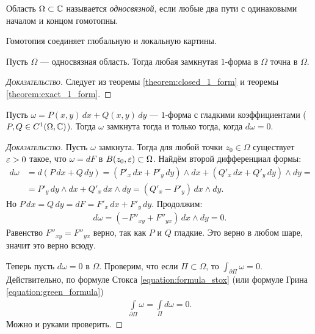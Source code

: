 \documentclass[../../main.tex]{subfiles}
\begin{document}
\begin{df}
 Область $\Omega \subset \mathbb{C}$ называется \textit{односвязной}, если любые два пути с одинаковыми началом и концом гомотопны.
\end{df}

Гомотопия соединяет глобальную и локальную картины.

\begin{crly}
 Пусть $\Omega$ --- односвязная область. Тогда любая замкнутая $1$-форма в $\Omega$ точна в $\Omega$.
\end{crly}
\begin{proof}[\normalfont\textsc{Доказательство}]
 Следует из теоремы \ref{theorem:closed_1_form} и теоремы \ref{theorem:exact_1_form}.
\end{proof}

\begin{thm}
 Пусть $\omega = P(x,y)\,dx + Q(x,y)\,dy$ --- $1$-форма с гладкими коэффициентами ($P, Q \in C^{1}(\Omega, \mathbb{C})$). Тогда $\omega$ замкнута тогда и только тогда, когда $d \omega = 0$.
\end{thm}
\begin{proof}[\normalfont\textsc{Доказательство}]
 Пусть $\omega$ замкнута. Тогда для любой точки $z_0 \in \Omega$  существует $\varepsilon > 0$ такое, что $\omega = dF$ в $B(z_0, \varepsilon) \subset \Omega$. Найдём второй дифференциал формы:
 \begin{align*}
  d \omega &= d(P\,dx + Q\,dy) = (P'_x \, dx + P'_y\,dy) \land dx + (Q'_x \, dx + Q'_y \, dy) \land dy = \\
  &= P'_y \, dy \land dx + Q'_x \, dx \land dy = (Q'_x - P'_y) \, dx \land dy.
 \end{align*} Но $P\,dx = Q \, dy = dF = F'_x \, dx + F'_y \, dy$. Продолжим:
 \begin{align*}
  d \omega = (-F''_{xy} + F''_{yx})\,dx \land dy = 0
 .\end{align*} Равенство $F''_{xy} = F''_{yx}$ верно, так как $P$ и $Q$ гладкие. Это верно в любом шаре, значит это верно всюду.


 Теперь пусть $d \omega = 0$ в $\Omega$. Проверим, что если $\Pi \subset \Omega$, то $\int_{\partial\Pi} \omega = 0 $. Действительно, по формуле Стокса \eqref{equation:formula_stox} (или формуле Грина \eqref{equation:green_formula})
 \begin{align*}
  \int\limits_{\partial\Pi} \omega = \int\limits_{\Pi} d\omega = 0.  
 \end{align*} Можно и руками проверить.
\end{proof}
\end{document}
